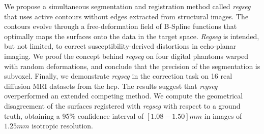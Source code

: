 We propose a simultaneous segmentation and registration method called \emph{regseg}
  that uses active contours without edges extracted from structural images.
The contours evolve through a free-deformation field of B-Spline functions that
  optimally maps the surfaces onto the data in the target space.
\emph{Regseg} is intended, but not limited, to correct susceptibility-derived distortions
  in echo-planar imaging.
We proof the concept behind \emph{regseg} on four digital phantoms warped with random
  deformations, and conclude that the precision of the segmentation is subvoxel.
Finally, we demonstrate \emph{regseg} in the correction task on 16 real diffusion MRI
  datasets from the \acrlong*{hcp}.
The results suggest that \emph{regseg} overperformed an extended competing method.
We compute the geometrical disagreement of the surfaces registered with \emph{regseg} with
  respect to a ground truth, obtaining a 95\% confidence interval of $[1.08 - 1.50]mm$ in images 
  of $1.25mm$ isotropic resolution.

